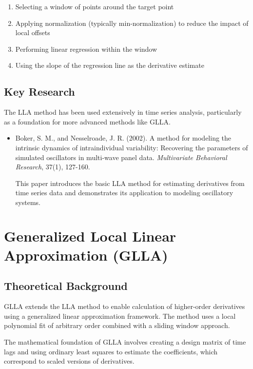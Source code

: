 \documentclass{article}
\begin{document}
\begin{enumerate}
    \item Selecting a window of points around the target point
    \item Applying normalization (typically min-normalization) to reduce the impact of local offsets
    \item Performing linear regression within the window
    \item Using the slope of the regression line as the derivative estimate
\end{enumerate}

\subsection{Key Research}

The LLA method has been used extensively in time series analysis, particularly as a foundation for more advanced methods like GLLA.

\begin{itemize}
    \item Boker, S. M., and Nesselroade, J. R. (2002). A method for modeling the intrinsic dynamics of intraindividual variability: Recovering the parameters of simulated oscillators in multi-wave panel data. \textit{Multivariate Behavioral Research}, 37(1), 127-160.
    
    This paper introduces the basic LLA method for estimating derivatives from time series data and demonstrates its application to modeling oscillatory systems.
\end{itemize}

\section{Generalized Local Linear Approximation (GLLA)}

\subsection{Theoretical Background}

GLLA extends the LLA method to enable calculation of higher-order derivatives using a generalized linear approximation framework. The method uses a local polynomial fit of arbitrary order combined with a sliding window approach.

The mathematical foundation of GLLA involves creating a design matrix of time lags and using ordinary least squares to estimate the coefficients, which correspond to scaled versions of derivatives.
\end{document}
